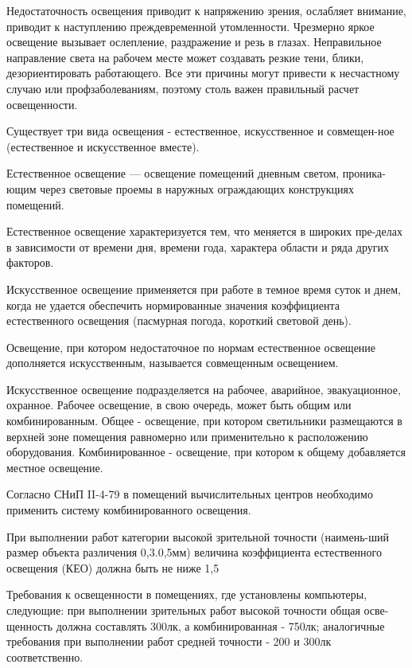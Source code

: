 Недостаточность освещения приводит к напряжению зрения, ослабляет внимание, приводит к наступлению преждевременной утомленности. Чрезмерно яркое освещение вызывает ослепление, раздражение и резь в глазах. Неправильное направление света на рабочем месте может создавать резкие тени, блики, дезориентировать работающего. Все эти причины могут привести к несчастному случаю или профзаболеваниям, поэтому столь важен правильный расчет освещенности.

Существует три вида освещения - естественное, искусственное и совмещен-ное (естественное и искусственное вместе).

Естественное освещение --- освещение помещений дневным светом, проника-ющим через световые проемы в наружных ограждающих конструкциях помещений.

Естественное освещение характеризуется тем, что меняется в широких пре-делах в зависимости от времени  дня, времени года, характера области и ряда других факторов.

Искусственное освещение применяется при работе в темное время суток и днем, когда не удается обеспечить нормированные значения коэффициента естественного освещения (пасмурная погода, короткий световой день).

Освещение, при котором недостаточное по нормам естественное освещение дополняется искусственным, называется совмещенным освещением.

Искусственное освещение подразделяется на рабочее, аварийное, эвакуационное, охранное. Рабочее освещение, в свою очередь, может быть общим или комбинированным. Общее - освещение, при котором светильники размещаются в верхней зоне помещения равномерно или применительно к расположению оборудования. Комбинированное - освещение, при котором к общему добавляется местное освещение.

Согласно СНиП II-4-79 в помещений вычислительных центров необходимо применить систему комбинированного освещения.

При выполнении работ категории высокой зрительной точности (наимень-ший размер объекта различения 0,3.0,5мм) величина коэффициента естественного освещения (КЕО) должна быть не ниже 1,5%

Требования к освещенности в помещениях, где установлены компьютеры, следующие: при выполнении зрительных работ высокой точности общая осве-щенность должна составлять 300лк, а комбинированная - 750лк; аналогичные требования при выполнении работ средней точности - 200 и 300лк соответственно.

